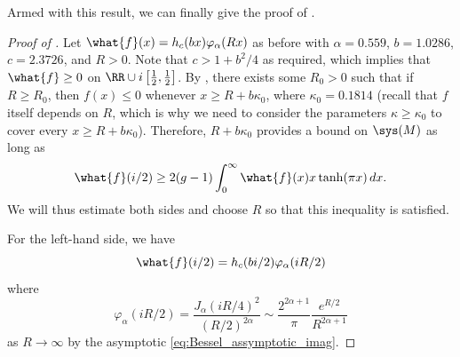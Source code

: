 \documentclass[12pt]{amsart}
\numberwithin{equation}{section}
\begin{document}
Armed with this result, we can finally give the proof of .

\begin{proof}[Proof of ]
Let $\what{f}(x) = h_c(bx) \varphi_\alpha(Rx)$ as before with $\alpha = 0.559$, $b=1.0286$, $c=2.3726$, and $R>0$. Note that $c>1+b^2/4$ as required, which implies that $\what{f} \geq 0$ on $\RR \cup i \left[\frac12,\frac12\right]$. By , there exists some $R_0 > 0$ such that if $R\geq R_0$, then $f(x) \leq 0$ whenever $x \geq R + b\kappa_0$, where $\kappa_0 = 0.1814$ (recall that $f$ itself depends on $R$, which is why we need to consider the parameters $\kappa \geq \kappa_0$ to cover every $x \geq R + b\kappa_0$). Therefore, $R+b\kappa_0$ provides a bound on $\sys(M)$ as long as 
\[
\what{f}(i/2) \geq 2(g-1) \int_0^\infty \what{f}(x) x \tanh(\pi x) \,dx.
\]
We will thus estimate both sides and choose $R$ so that this inequality is satisfied.

For the left-hand side, we have
\[
\what{f}(i/2) = h_c(bi/2)\varphi_\alpha(iR/2)
\]
where
\[
\varphi_\alpha(iR/2) = \frac{J_\alpha(iR/4)^2}{(R/2)^{2\alpha}} \sim \frac{2^{2\alpha+1}}{\pi} \frac{e^{R/2}}{R^{2\alpha+1}}
\]
as $R \to \infty$ by the asymptotic \eqref{eq:Bessel_assymptotic_imag}.


\end{proof}
\end{document}
